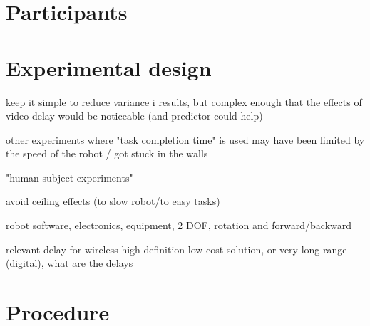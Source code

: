 
\section{Participants}

\section{Experimental design}

keep it simple to reduce variance i results, but complex enough that the effects of video delay would be noticeable (and predictor could help)

other experiments where "task completion time" is used may have been limited by the speed of the robot / got stuck in the walls

"human subject experiments"

avoid ceiling effects (to slow robot/to easy tasks)

robot software, electronics, equipment, 2 DOF, rotation and forward/backward

relevant delay for wireless high definition low cost solution, or very long range (digital), what are the delays


\section{Procedure}

